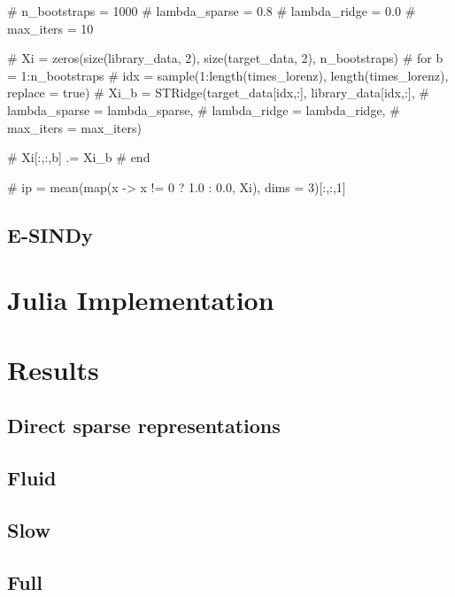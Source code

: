 \documentclass[
]{article}
\newenvironment{Shaded}{\begin{snugshade}}{\end{snugshade}}
\newcommand{\CommentTok}[1]{\textcolor[rgb]{0.37,0.37,0.37}{#1}}
\begin{document}
\begin{Shaded}
\begin{Highlighting}[]
\CommentTok{\# n\_bootstraps = 1000}
\CommentTok{\# lambda\_sparse = 0.8}
\CommentTok{\# lambda\_ridge = 0.0}
\CommentTok{\# max\_iters = 10}

\CommentTok{\# Xi = zeros(size(library\_data, 2), size(target\_data, 2), n\_bootstraps)}
\CommentTok{\# for b = 1:n\_bootstraps}
\CommentTok{\#     idx = sample(1:length(times\_lorenz), length(times\_lorenz), replace = true)}
\CommentTok{\#     Xi\_b = STRidge(target\_data[idx,:], library\_data[idx,:], }
\CommentTok{\#         lambda\_sparse = lambda\_sparse,}
\CommentTok{\#         lambda\_ridge = lambda\_ridge,}
\CommentTok{\#         max\_iters = max\_iters)}

\CommentTok{\#     Xi[:,:,b] .= Xi\_b}
\CommentTok{\# end}

\CommentTok{\# ip = mean(map(x {-}\textgreater{} x != 0 ? 1.0 : 0.0, Xi), dims = 3)[:,:,1]}
\end{Highlighting}
\end{Shaded}

\subsection{E-SINDy}\label{e-sindy}

\section{Julia Implementation}\label{julia-implementation}

\section{Results}\label{results}

\subsection{Direct sparse
representations}\label{direct-sparse-representations}

\subsection{Fluid}\label{fluid}

\subsection{Slow}\label{slow}

\subsection{Full}\label{full}


\printbibliography[title=Conclusions]
\end{document}
